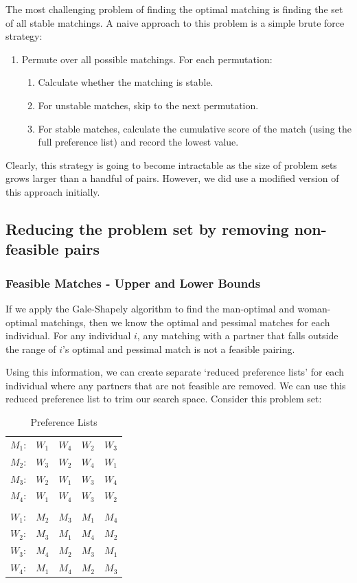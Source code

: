 \documentclass[a4paper]{article}
\begin{document}
The most challenging problem of finding the optimal matching is finding the set of all stable matchings. A naive approach to this problem is a simple brute force strategy:
\begin{enumerate}
    \item Permute over all possible matchings. For each permutation:
    \begin{enumerate}
        \item Calculate whether the matching is stable.
        \item For unstable matches, skip to the next permutation.
        \item For stable matches, calculate the cumulative score of the match (using the full preference list) and record the lowest value.
    \end{enumerate}
\end{enumerate}

Clearly, this strategy is going to become intractable as the size of problem sets grows larger than a handful of pairs. However, we did use a modified version of this approach initially.

\subsection{Reducing the problem set by removing non-feasible pairs}
\subsubsection{Feasible Matches - Upper and Lower Bounds}
If we apply the Gale-Shapely algorithm to find the man-optimal and woman-optimal matchings, then we know the optimal and pessimal matches for each individual. For any individual $i$, any matching with a partner that falls outside the range of $i$'s optimal and pessimal match is not a feasible pairing.

Using this information, we can create separate `reduced preference lists' for each individual where any partners that are not feasible are removed. We can use this reduced preference list to trim our search space. Consider this problem set:

\begin{table}[H]
\centering
\caption{Preference Lists}
\begin{tabular}{lllll}
$M_1$: & $W_1$ & $W_4$ & $W_2$ & $W_3$ \\
$M_2$: & $W_3$ & $W_2$ & $W_4$ & $W_1$ \\
$M_3$: & $W_2$ & $W_1$ & $W_3$ & $W_4$ \\
$M_4$: & $W_1$ & $W_4$ & $W_3$ & $W_2$ \\
\\
$W_1$: & $M_2$ & $M_3$ & $M_1$ & $M_4$ \\
$W_2$: & $M_3$ & $M_1$ & $M_4$ & $M_2$ \\
$W_3$: & $M_4$ & $M_2$ & $M_3$ & $M_1$ \\
$W_4$: & $M_1$ & $M_4$ & $M_2$ & $M_3$ \\
\end{tabular}
\end{table}
\end{document}
